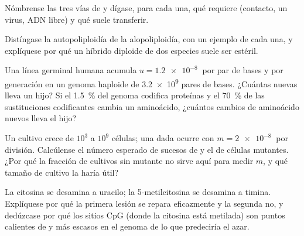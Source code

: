 \begin{exercise}[$\star$]\label{exo:b2:genome-diversification:3}
Nómbrense las tres vías de  y dígase,
para cada una, qué requiere (contacto, un virus, ADN libre) y qué suele
transferir.
\end{exercise}

\begin{exercise}[$\star$]\label{exo:b2:genome-diversification:4}
Distíngase la autopoliploidía de la alopoliploidía, con un ejemplo de
cada una, y explíquese por qué un híbrido diploide de dos especies suele
ser estéril.
\end{exercise}

\begin{exercise}[$\star\star$]\label{exo:b2:genome-diversification:5}
Una línea germinal humana acumula $u = \qty{1.2e-8}{}$  por
par de bases y por generación en un genoma haploide de \qty{3.2e9}{} pares
de bases. ¿Cuántas  nuevas lleva un hijo? Si el \qty{1.5}{\%}
del genoma codifica proteínas y el \qty{70}{\%} de las sustituciones
codificantes cambia un aminoácido, ¿cuántos cambios de aminoácido nuevos
lleva el hijo?
\end{exercise}

\begin{exercise}[$\star\star$]\label{exo:b2:genome-diversification:6}
Un cultivo crece de $10^{3}$ a $10^{9}$ células; una  dada
ocurre con $m = \qty{2e-8}{}$ por división. Calcúlense el número esperado
de sucesos de  y el de células mutantes. ¿Por qué la fracción de
cultivos sin mutante no sirve aquí para medir $m$, y qué tamaño de
cultivo la haría útil?
\end{exercise}

\begin{exercise}[$\star\star$]\label{exo:b2:genome-diversification:7}
La citosina se desamina a uracilo; la 5-metilcitosina se desamina a
timina. Explíquese por qué la primera lesión se repara eficazmente y la
segunda no, y dedúzcase por qué los sitios CpG (donde la citosina está
metilada) son puntos calientes de  y más escasos en el genoma de
lo que predeciría el azar.
\end{exercise}

